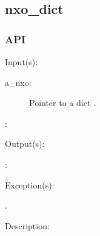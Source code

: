 %
%
%
%
%              

\subsection{nxo\_dict}
\label{nxo_dict}

\subsubsection{API}
\begin{capi}
\label{nxo_dict_}
	\begin{capilist}
	\item[Input(s): ]
		\begin{description}\item[]
		\item[a\_nxo: ]
			Pointer to a dict .
		\item[: ]
		\end{description}
	\item[Output(s): ]
		\begin{description}\item[]
		\item[: ]
		\end{description}
	\item[Exception(s): ]
		\begin{description}\item[]
		\item[.]
		\end{description}
	\item[Description: ]
	\end{capilist}
\end{capi}
